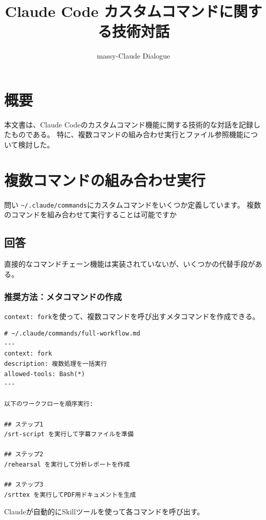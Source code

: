\documentclass[a4paper,10pt,twocolumn]{ltjsarticle}
\title{Claude Code カスタムコマンドに関する技術対話}
\author{massy-Claude Dialogue}
\date{}
\begin{document}
\maketitle
\thispagestyle{firstpage}

\section*{概要}

本文書は、Claude Codeのカスタムコマンド機能に関する技術的な対話を記録したものである。
特に、複数コマンドの組み合わせ実行とファイル参照機能について検討した。

\section{複数コマンドの組み合わせ実行}

\begin{itembox}[l]{問い}
\texttt{\textasciitilde/.claude/commands}にカスタムコマンドをいくつか定義しています。
複数のコマンドを組み合わせて実行することは可能ですか
\end{itembox}

\subsection{回答}

直接的なコマンドチェーン機能は実装されていないが、いくつかの代替手段がある。

\subsubsection{推奨方法：メタコマンドの作成}

\texttt{context: fork}を使って、複数コマンドを呼び出すメタコマンドを作成できる。

\begin{lstlisting}[language={}]
# ~/.claude/commands/full-workflow.md
---
context: fork
description: 複数処理を一括実行
allowed-tools: Bash(*)
---

以下のワークフローを順序実行:

## ステップ1
/srt-script を実行して字幕ファイルを準備

## ステップ2
/rehearsal を実行して分析レポートを作成

## ステップ3
/srttex を実行してPDF用ドキュメントを生成
\end{lstlisting}

Claudeが自動的にSkillツールを使って各コマンドを呼び出す。
\end{document}
